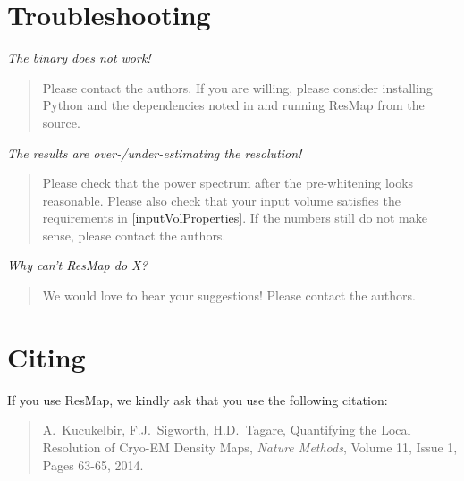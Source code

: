 \documentclass[10pt]{article}
\begin{document}

\clearpage
\section{Troubleshooting}

\textcolor{RedOrange}{\emph{The binary does not work!}}
\begin{quote}
	Please contact the authors. If you are willing, please consider installing Python and the dependencies noted in  and running ResMap from the source.
\end{quote}

\textcolor{RedOrange}{\emph{The results are over-/under-estimating the resolution!}}
\begin{quote}
	Please check that the power spectrum after the pre-whitening looks reasonable. Please also check that your input volume satisfies the requirements in \cref{inputVolProperties}. If the numbers still do not make sense, please contact the authors.
\end{quote}

\textcolor{RedOrange}{\emph{Why can't ResMap do X?}}
\begin{quote}
	We would love to hear your suggestions! Please contact the authors.
\end{quote}

\section{Citing}
If you use ResMap, we kindly ask that you use the following citation:

\begin{quote}
	A.~Kucukelbir, F.J.~Sigworth, H.D.~Tagare, \textcolor{BrickRed}{Quantifying the Local Resolution of Cryo-EM Density Maps}, \textcolor{OliveGreen}{\emph{Nature Methods}}, Volume 11, Issue 1, Pages 63-65, 2014.
\end{quote}
\end{document}

